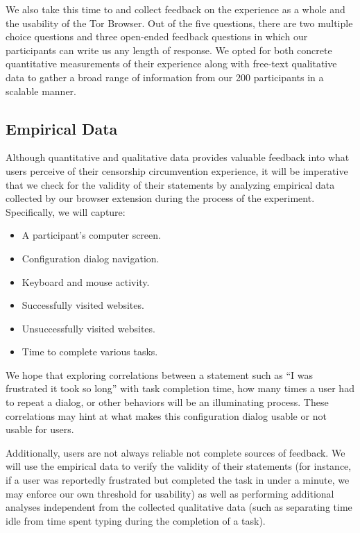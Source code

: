 \documentclass[letterpaper,twocolumn,11pt]{article}
\begin{document}
We also take this time to and collect feedback on the experience as a whole and the usability of 
the Tor Browser. Out of the five questions, there are two multiple choice questions and three 
open-ended feedback questions in which our participants can write us any length of response. 
We opted for both concrete quantitative measurements of their experience along with free-text
qualitative data to gather a broad range of information from our 200 participants in a scalable manner. 

\subsection{Empirical Data} 
Although quantitative and qualitative data provides valuable feedback into what users perceive of 
their censorship circumvention experience, it will be imperative that we check for the validity of their 
statements by analyzing empirical data collected by our browser extension during the process of the
experiment. Specifically, we will capture: 

\begin{itemize} \itemsep1pt \parskip0pt 
\item A participant's computer screen. 
\item Configuration dialog navigation. 
\item Keyboard and mouse activity.
\item Successfully visited websites. 
\item Unsuccessfully visited websites. 
\item Time to complete various tasks.
\end{itemize}

We hope that exploring correlations between a statement such as  ``I was frustrated it took so long'' 
with task completion time, how many times a user had to repeat a dialog, or other behaviors 
will be an illuminating process. These correlations may hint at what makes this configuration dialog 
usable or not usable for users. 

Additionally, users are not always reliable not complete sources of feedback. We will use the 
empirical data to verify the validity of their statements (for instance, if a user was reportedly frustrated 
but completed the task in under a minute, we may enforce our own threshold for usability) as well as 
performing additional analyses independent from the collected qualitative data (such as separating time
idle from time spent typing during the completion of a task).
\end{document}
